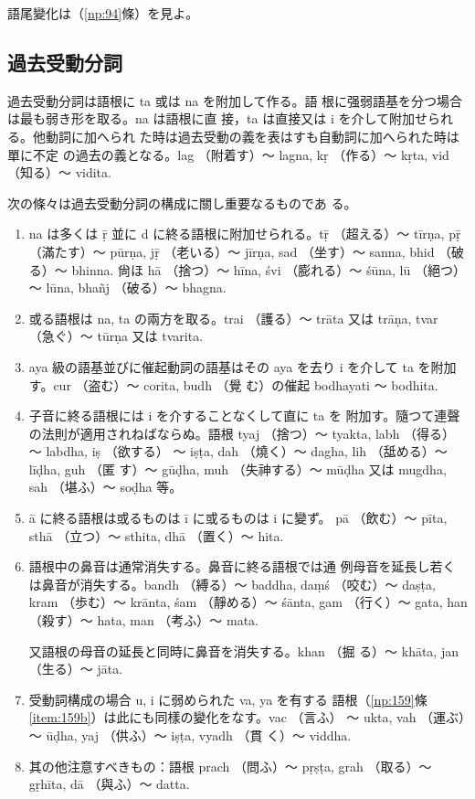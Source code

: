 語尾變化は（\ref{np:94}條）を見よ。

\subsection{過去受動分詞}
\numberParagraph
過去受動分詞は語根に ta 或は na を附加して作る。語
根に强弱語基を分つ場合は最も弱き形を取る。na は語根に直
接，ta は直接又は i を介して附加せられる。他動詞に加へられ
た時は過去受動の義を表はすも自動詞に加へられた時は單に不定
の過去の義となる。lag （附着す）～ lagna, kṛ （作る）～ kṛta, vid
（知る）～ vidita.

\numberParagraph \label{np:179}
次の條々は過去受動分詞の構成に關し重要なるものであ
る。
\begin{enumerate}[label=(\alph*)]
\item na は多くは ṝ 並に d に終る語根に附加せられる。tṝ
（超える）～ tīrṇa, pṝ （滿たす）～ pūrṇa, jṝ （老いる）～
jīrṇa, sad （坐す）～ sanna, bhid （破る）～ bhinna. 尙ほ
hā （捨つ）～ hīna, śvi （膨れる）～ śūna, lū （絕つ）～ lūna,
bhañj （破る）～ bhagna.
\item 或る語根は na, ta の兩方を取る。trai （護る）～ trāta
又は trāṇa, tvar （急ぐ）～ tūrṇa 又は tvarita.
\item aya 級の語基並びに催起動詞の語基はその aya を去り
i を介して ta を附加す。cur （盗む）～ corita, budh （覺
む）の催起 bodhayati ～ bodhita.
\item 子音に終る語根には i を介することなくして直に ta を
附加す。隨つて連聲の法則が適用されねばならぬ。語根
tyaj （捨つ）～ tyakta, labh （得る）～ labdha, iṣ （欲する）
～ iṣṭa, dah （燒く）～ dagha, lih （䑛める）～ līḍha, guh （匿
す）～ gūḍha, muh （失神する）～ mūḍha 又は mugdha, sah
（堪ふ）～ soḍha 等。
\item ā に終る語根は或るものは ī に或るものは i に變ず。
pā （飲む）～ pīta, sthā （立つ）～ sthita, dhā （置く）～ hita.
\item 語根中の鼻音は通常消失する。鼻音に終る語根では通
例母音を延長し若くは鼻音が消失する。bandh （縛る）～
baddha, daṃś （咬む）～ daṣṭa, kram （歩む）～ krānta, śam
（靜める）～ śānta, gam （行く）～ gata, han （殺す）～ hata,
man （考ふ）～ mata.

又語根の母音の延長と同時に鼻音を消失する。khan （掘
る）～ khāta, jan （生る）～ jāta.
\item 受動詞構成の場合 u, i に弱められた va, ya を有する
語根（\ref{np:159}條 \ref{item:159b}）は此にも同樣の變化をなす。vac （言ふ）
～ ukta, vah （運ぶ）～ ūḍha, yaj （供ふ）～ iṣṭa, vyadh （貫
く）～ viddha.
\item 其の他注意すべきもの：語根 prach （問ふ）～ pṛṣṭa,
grah （取る）～ gṛhīta, dā （與ふ）～ datta.
\end{enumerate}


